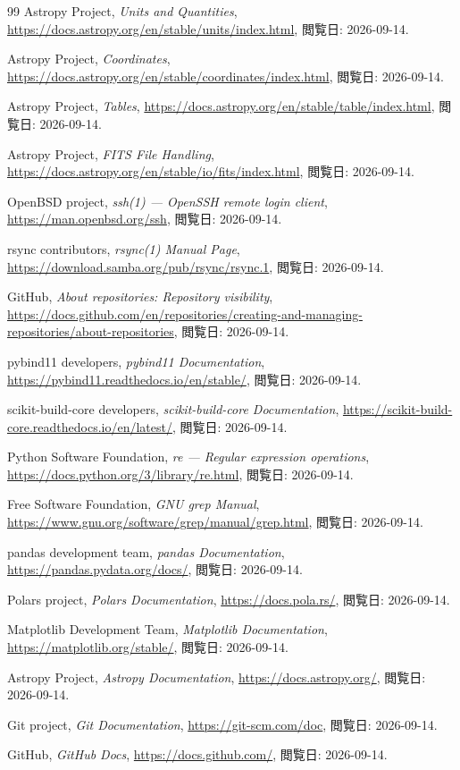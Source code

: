 \begin{thebibliography}{99}
Astropy Project,
\textit{Units and Quantities},
\url{https://docs.astropy.org/en/stable/units/index.html},
閲覧日: 2026-09-14.

Astropy Project,
\textit{Coordinates},
\url{https://docs.astropy.org/en/stable/coordinates/index.html},
閲覧日: 2026-09-14.

Astropy Project,
\textit{Tables},
\url{https://docs.astropy.org/en/stable/table/index.html},
閲覧日: 2026-09-14.

Astropy Project,
\textit{FITS File Handling},
\url{https://docs.astropy.org/en/stable/io/fits/index.html},
閲覧日: 2026-09-14.

OpenBSD project,
\textit{ssh(1) --- OpenSSH remote login client},
\url{https://man.openbsd.org/ssh},
閲覧日: 2026-09-14.

rsync contributors,
\textit{rsync(1) Manual Page},
\url{https://download.samba.org/pub/rsync/rsync.1},
閲覧日: 2026-09-14.

GitHub,
\textit{About repositories: Repository visibility},
\url{https://docs.github.com/en/repositories/creating-and-managing-repositories/about-repositories},
閲覧日: 2026-09-14.

pybind11 developers,
\textit{pybind11 Documentation},
\url{https://pybind11.readthedocs.io/en/stable/},
閲覧日: 2026-09-14.

scikit-build-core developers,
\textit{scikit-build-core Documentation},
\url{https://scikit-build-core.readthedocs.io/en/latest/},
閲覧日: 2026-09-14.

Python Software Foundation,
\textit{re --- Regular expression operations},
\url{https://docs.python.org/3/library/re.html},
閲覧日: 2026-09-14.

Free Software Foundation,
\textit{GNU grep Manual},
\url{https://www.gnu.org/software/grep/manual/grep.html},
閲覧日: 2026-09-14.

pandas development team,
\textit{pandas Documentation},
\url{https://pandas.pydata.org/docs/},
閲覧日: 2026-09-14.

Polars project,
\textit{Polars Documentation},
\url{https://docs.pola.rs/},
閲覧日: 2026-09-14.

Matplotlib Development Team,
\textit{Matplotlib Documentation},
\url{https://matplotlib.org/stable/},
閲覧日: 2026-09-14.

Astropy Project,
\textit{Astropy Documentation},
\url{https://docs.astropy.org/},
閲覧日: 2026-09-14.

Git project,
\textit{Git Documentation},
\url{https://git-scm.com/doc},
閲覧日: 2026-09-14.

GitHub,
\textit{GitHub Docs},
\url{https://docs.github.com/},
閲覧日: 2026-09-14.

\end{thebibliography}
